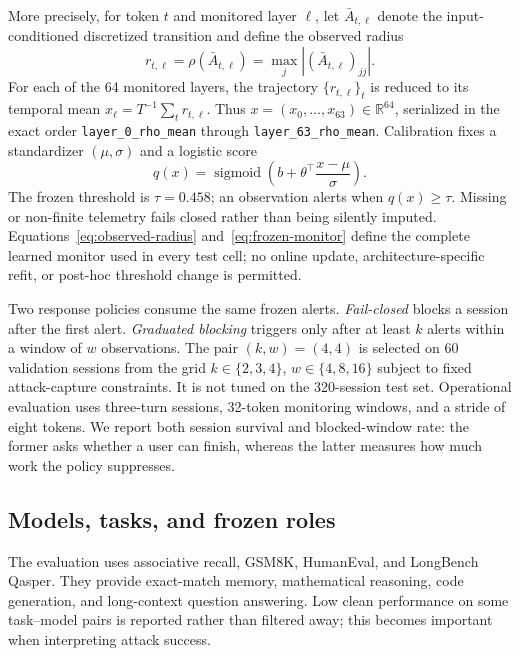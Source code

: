 \documentclass[sigconf]{acmart}
\begin{document}
More precisely, for token $t$ and monitored layer $\ell$, let
$\bar A_{t,\ell}$ denote the input-conditioned discretized transition and
define the observed radius
\begin{equation}
  r_{t,\ell}=\rho(\bar A_{t,\ell})
  =\max_j |(\bar A_{t,\ell})_{jj}|.
  \label{eq:observed-radius}
\end{equation}
For each of the 64 monitored layers, the trajectory $\{r_{t,\ell}\}_t$ is
reduced to its temporal mean $x_\ell=T^{-1}\sum_t r_{t,\ell}$. Thus
$x=(x_0,\ldots,x_{63})\in\mathbb{R}^{64}$, serialized in the exact order
\texttt{layer\_0\_rho\_mean} through \texttt{layer\_63\_rho\_mean}.
Calibration fixes a
standardizer $(\mu,\sigma)$ and a logistic score
\begin{equation}
  q(x)=\operatorname{sigmoid}\!\left(
  b+\theta^\top\frac{x-\mu}{\sigma}\right).
  \label{eq:frozen-monitor}
\end{equation}
The frozen threshold is $\tau=0.458$; an observation alerts when
$q(x)\ge\tau$. Missing or non-finite telemetry fails closed rather than being
silently imputed. Equations~\eqref{eq:observed-radius}
and~\eqref{eq:frozen-monitor} define the complete learned monitor used in every
test cell; no online update, architecture-specific refit, or post-hoc threshold
change is permitted.

Two response policies consume the same frozen alerts. \emph{Fail-closed}
blocks a session after the first alert. \emph{Graduated blocking} triggers only
after at least $k$ alerts within a window of $w$ observations. The pair
$(k,w)=(4,4)$ is selected on 60 validation sessions from the grid
$k\in\{2,3,4\}$, $w\in\{4,8,16\}$ subject to fixed attack-capture constraints.
It is not tuned on the 320-session test set. Operational evaluation uses
three-turn sessions, 32-token monitoring windows, and a stride of eight tokens.
We report both
session survival and blocked-window rate: the former asks whether a user can
finish, whereas the latter measures how much work the policy suppresses.

\subsection{Models, tasks, and frozen roles}
The evaluation uses associative recall, GSM8K, HumanEval, and LongBench Qasper.
They provide exact-match memory, mathematical reasoning, code generation, and
long-context question answering. Low clean performance on some task--model
pairs is reported rather than filtered away; this becomes important when
interpreting attack success.
\end{document}
